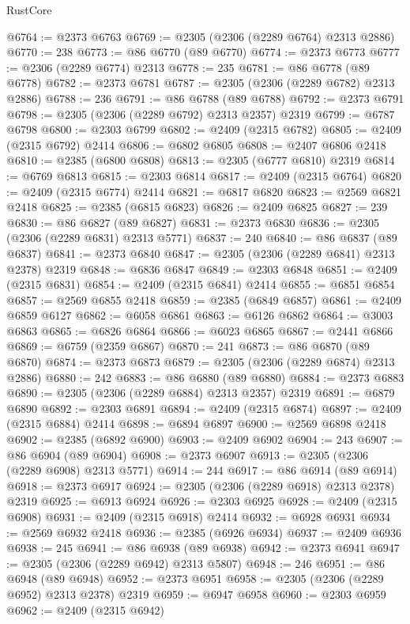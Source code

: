 \begin{lexlean}{RustCore}
\begin{coremodule}
@6764 := @2373 @6763
@6769 := @2305 (@2306 (@2289 @6764) @2313 @2886)
@6770 := 238
@6773 := @86 @6770 (@89 @6770)
@6774 := @2373 @6773
@6777 := @2306 (@2289 @6774) @2313
@6778 := 235
@6781 := @86 @6778 (@89 @6778)
@6782 := @2373 @6781
@6787 := @2305 (@2306 (@2289 @6782) @2313 @2886)
@6788 := 236
@6791 := @86 @6788 (@89 @6788)
@6792 := @2373 @6791
@6798 := @2305 (@2306 (@2289 @6792) @2313 @2357) @2319
@6799 := @6787 @6798
@6800 := @2303 @6799
@6802 := @2409 (@2315 @6782)
@6805 := @2409 (@2315 @6792) @2414
@6806 := @6802 @6805
@6808 := @2407 @6806 @2418
@6810 := @2385 (@6800 @6808)
@6813 := @2305 (@6777 @6810) @2319
@6814 := @6769 @6813
@6815 := @2303 @6814
@6817 := @2409 (@2315 @6764)
@6820 := @2409 (@2315 @6774) @2414
@6821 := @6817 @6820
@6823 := @2569 @6821 @2418
@6825 := @2385 (@6815 @6823)
@6826 := @2409 @6825
@6827 := 239
@6830 := @86 @6827 (@89 @6827)
@6831 := @2373 @6830
@6836 := @2305 (@2306 (@2289 @6831) @2313 @5771)
@6837 := 240
@6840 := @86 @6837 (@89 @6837)
@6841 := @2373 @6840
@6847 := @2305 (@2306 (@2289 @6841) @2313 @2378) @2319
@6848 := @6836 @6847
@6849 := @2303 @6848
@6851 := @2409 (@2315 @6831)
@6854 := @2409 (@2315 @6841) @2414
@6855 := @6851 @6854
@6857 := @2569 @6855 @2418
@6859 := @2385 (@6849 @6857)
@6861 := @2409 @6859 @6127
@6862 := @6058 @6861
@6863 := @6126 @6862
@6864 := @3003 @6863
@6865 := @6826 @6864
@6866 := @6023 @6865
@6867 := @2441 @6866
@6869 := @6759 (@2359 @6867)
@6870 := 241
@6873 := @86 @6870 (@89 @6870)
@6874 := @2373 @6873
@6879 := @2305 (@2306 (@2289 @6874) @2313 @2886)
@6880 := 242
@6883 := @86 @6880 (@89 @6880)
@6884 := @2373 @6883
@6890 := @2305 (@2306 (@2289 @6884) @2313 @2357) @2319
@6891 := @6879 @6890
@6892 := @2303 @6891
@6894 := @2409 (@2315 @6874)
@6897 := @2409 (@2315 @6884) @2414
@6898 := @6894 @6897
@6900 := @2569 @6898 @2418
@6902 := @2385 (@6892 @6900)
@6903 := @2409 @6902
@6904 := 243
@6907 := @86 @6904 (@89 @6904)
@6908 := @2373 @6907
@6913 := @2305 (@2306 (@2289 @6908) @2313 @5771)
@6914 := 244
@6917 := @86 @6914 (@89 @6914)
@6918 := @2373 @6917
@6924 := @2305 (@2306 (@2289 @6918) @2313 @2378) @2319
@6925 := @6913 @6924
@6926 := @2303 @6925
@6928 := @2409 (@2315 @6908)
@6931 := @2409 (@2315 @6918) @2414
@6932 := @6928 @6931
@6934 := @2569 @6932 @2418
@6936 := @2385 (@6926 @6934)
@6937 := @2409 @6936
@6938 := 245
@6941 := @86 @6938 (@89 @6938)
@6942 := @2373 @6941
@6947 := @2305 (@2306 (@2289 @6942) @2313 @5807)
@6948 := 246
@6951 := @86 @6948 (@89 @6948)
@6952 := @2373 @6951
@6958 := @2305 (@2306 (@2289 @6952) @2313 @2378) @2319
@6959 := @6947 @6958
@6960 := @2303 @6959
@6962 := @2409 (@2315 @6942)

\end{coremodule}
\end{lexlean}

